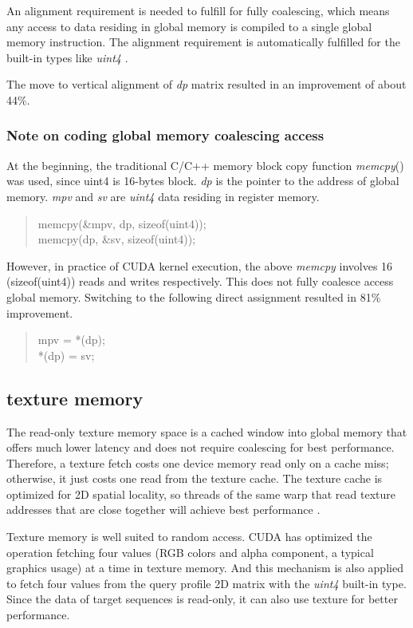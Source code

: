 An alignment requirement is needed to fulfill for fully coalescing, which means any access to data residing in global memory is compiled to a single global memory instruction. The alignment requirement is automatically fulfilled for the built-in types like \emph{uint4} \citep{CUDA-C}.

The move to vertical alignment of \emph{dp} matrix resulted in an improvement of about 44\%.

\subsubsection*{Note on coding global memory coalescing access}
At the beginning, the traditional C/C++ memory block copy function \emph{memcpy}() was used, since uint4 is 16-bytes block. \emph{dp} is the pointer to the address of global memory. \emph{mpv} and \emph{sv} are \emph{uint4} data residing in register memory.

\begin{quote}
\selectfont
 memcpy(\&mpv, dp, sizeof(uint4));\\
 memcpy(dp, \&sv, sizeof(uint4));
\end{quote}

However, in practice of CUDA kernel execution, the above \emph{memcpy} involves 16 (sizeof(uint4)) reads and writes respectively. This does not fully coalesce access global memory. Switching to the following direct assignment resulted in 81\% improvement.

\begin{quote}
\selectfont
 mpv = *(dp);\\
 *(dp) = sv;
\end{quote}

\subsection{texture memory}
\label{tex}

The read-only texture memory space is a cached window into global memory that offers much lower latency and does not require coalescing for best performance. Therefore, a texture fetch costs one device memory read only on a cache miss; otherwise, it just costs one read from the texture cache. The texture cache is optimized for 2D spatial locality, so threads of the same warp that read texture addresses that are close together will achieve best performance \citep{CUDA-C}.

Texture memory is well suited to random access. CUDA has optimized the operation fetching four values (RGB colors and alpha component, a typical graphics usage) at a time in texture memory. And this mechanism is also applied to fetch four values from the query profile 2D matrix with the \emph{uint4} built-in type. Since the data of target sequences is read-only, it can also use texture for better performance.

